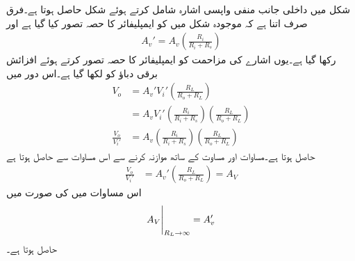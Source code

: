 شکل  میں  داخلی جانب منفی واپسی  اشارہ  شامل کرتے ہوئے  شکل  حاصل ہوتا ہے۔فرق صرف اتنا ہے کہ موجودہ شکل میں  کو ایمپلیفائر کا حصہ تصور کیا گیا ہے اور 
\begin{align} \label{مساوات_واپسی_افزائش_برقی_دباو_بمع_اشارہ_مزاحمت}
A_v'=A_v \left (\frac{R_i}{R_i + R_s} \right )
\end{align} 
رکھا گیا ہے۔یوں اشارے کی مزاحمت  کو ایمپلیفائر کا حصہ تصور کرتے ہوئے افزائش برقی دباؤ کو  لکھا گیا ہے۔اس دور میں
\begin{align*}
V_o &=A_v'  V_i' \left (\frac{R_L}{R_o +R_L} \right) \\
&= A_v V_i' \left (\frac{R_i}{R_i+R_s} \right ) \left (\frac{R_L}{R_o+R_L} \right ) \\
\frac{V_o}{V_i'}&=A_v \left (\frac{R_i}{R_i+R_s} \right ) \left (\frac{R_L}{R_o+R_L} \right  )
\end{align*}
حاصل ہوتا ہے۔مساوات  اور مساوت  کے ساتھ موازنہ کرنے سے اس مساوات سے حاصل ہوتا ہے
\begin{align}  \label{مساوات_واپسی_دباو_افزائش_ب}
\frac{V_o}{V_i'}&=A_v' \left (\frac{R_L}{R_o+R_L} \right  ) =A_V
\end{align}
اس مساوات میں  کی صورت میں
\begin{align} \label{مساوات_واپسی_لامحدود_مزاحمت_پر_افزائش_برقی_دباو_ب}
\eval{A_V}_{R_L \to \infty} = A_v'
\end{align}
حاصل ہوتا ہے۔

